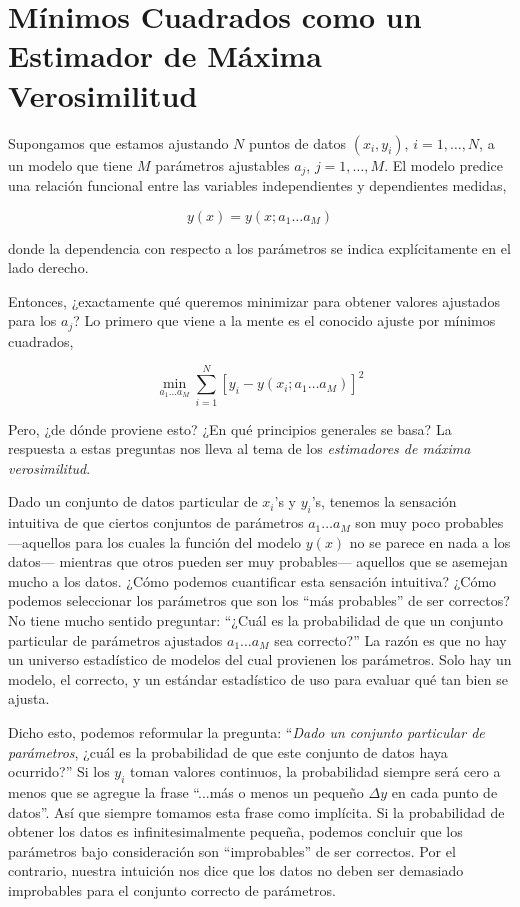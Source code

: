 \documentclass[10pt,a4paper]{book}
\begin{document}
\newpage

\section{Mínimos Cuadrados como un Estimador de Máxima Verosimilitud}

Supongamos que estamos ajustando $N$ puntos de datos $(x_i, y_i)$, $i = 1, \ldots, N$, a un modelo que tiene $M$ parámetros ajustables $a_j$, $j = 1, \ldots, M$. El modelo predice una relación funcional entre las variables independientes y dependientes medidas,

\begin{equation}
y(x) = y(x; a_1 \ldots a_M) \tag{15.1.1}
\end{equation}

donde la dependencia con respecto a los parámetros se indica explícitamente en el lado derecho.

Entonces, ¿exactamente qué queremos minimizar para obtener valores ajustados para los $a_j$? Lo primero que viene a la mente es el conocido ajuste por mínimos cuadrados,

\begin{equation}
\min_{a_1 \ldots a_M} \sum_{i=1}^{N} \left[y_i - y(x_i; a_1 \ldots a_M)\right]^2 \tag{15.1.2}
\end{equation}

Pero, ¿de dónde proviene esto? ¿En qué principios generales se basa? La respuesta a estas preguntas nos lleva al tema de los \textit{estimadores de máxima verosimilitud}.

Dado un conjunto de datos particular de $x_i$’s y $y_i$’s, tenemos la sensación intuitiva de que ciertos conjuntos de parámetros $a_1 \ldots a_M$ son muy poco probables —aquellos para los cuales la función del modelo $y(x)$ no se parece en nada a los datos— mientras que otros pueden ser muy probables— aquellos que se asemejan mucho a los datos. ¿Cómo podemos cuantificar esta sensación intuitiva? ¿Cómo podemos seleccionar los parámetros que son los “más probables” de ser correctos? No tiene mucho sentido preguntar: “¿Cuál es la probabilidad de que un conjunto particular de parámetros ajustados $a_1 \ldots a_M$ sea correcto?” La razón es que no hay un universo estadístico de modelos del cual provienen los parámetros. Solo hay un modelo, el correcto, y un estándar estadístico de uso para evaluar qué tan bien se ajusta.

Dicho esto, podemos reformular la pregunta: ``\textit{Dado un conjunto particular de parámetros}, ¿cuál es la probabilidad de que este conjunto de datos haya ocurrido?'' Si los $y_i$ toman valores continuos, la probabilidad siempre será cero a menos que se agregue la frase ``...más o menos un pequeño $\Delta y$ en cada punto de datos''. Así que siempre tomamos esta frase como implícita. Si la probabilidad de obtener los datos es infinitesimalmente pequeña, podemos concluir que los parámetros bajo consideración son ``improbables'' de ser correctos. Por el contrario, nuestra intuición nos dice que los datos no deben ser demasiado improbables para el conjunto correcto de parámetros.
\end{document}
